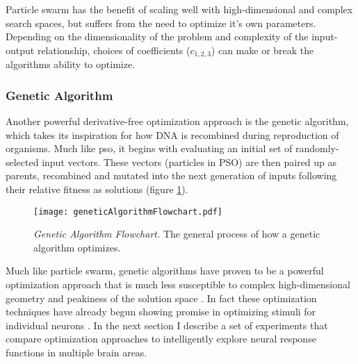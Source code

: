 Particle swarm has the benefit of scaling well with high-dimensional and complex search spaces, but suffers from the need to optimize it's own parameters. Depending on the dimensionality of the problem and complexity of the input-output relationship, choices of coefficients ($c_{1,2,3}$) can make or break the algorithms ability to optimize. 

\subsubsection*{Genetic Algorithm}
Another powerful derivative-free optimization approach is the genetic algorithm, which takes its inspiration for how DNA is recombined during reproduction of organisms. Much like \gls{pso}, it begins with evaluating an initial set of randomly-selected input vectors. These vectors (particles in PSO) are then paired up as parents, recombined and mutated into the next generation of inputs following their relative fitness as solutions (figure \ref{fig:geneticFlowchart}). 

	\begin{figure}[h]
		\centering
		\texttt{[image: geneticAlgorithmFlowchart.pdf]} 
		{\caption{{\it Genetic Algorithm Flowchart.} The general process of how a genetic algorithm optimizes.}
		\label{fig:geneticFlowchart}}
	\end{figure}

Much like particle swarm, genetic algorithms have proven to be a powerful optimization approach that is much less susceptible to complex high-dimensional geometry and peakiness of the solution space \parencite{Whitley1994, Mirjalili2019}. In fact these optimization techniques have already begun showing promise in optimizing stimuli for individual neurons \parencite{Ponce2019, Bashivan2019}. In the next section I describe a set of experiments that compare optimization approaches to intelligently explore neural response functions in multiple brain areas.  

 